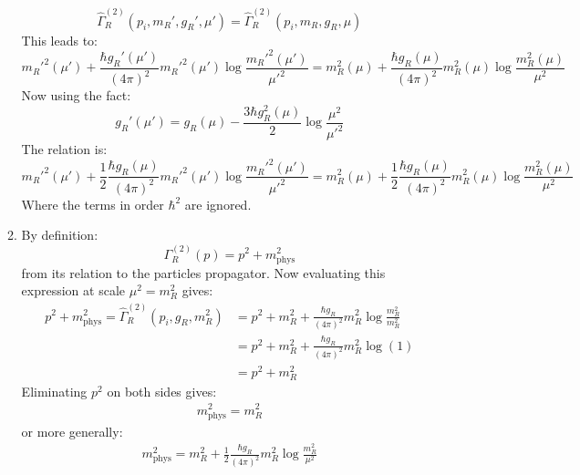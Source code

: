 \documentclass[12pt,a4]{article}
\begin{document}
\begin{enumerate}
\begin{enumerate}
        \begin{equation*}
          \hat\Gamma^{(2)}_R(p_i, m_R', g_R', \mu') =  \hat\Gamma^{(2)}_R(p_i, m_R, g_R, \mu)
        \end{equation*}
        This leads to:
        \begin{equation*}
          m_R'^2(\mu') + \frac{\hbar g_R'(\mu') }{(4\pi)^2}  m_R'^2(\mu') \log \frac{m_R'^2(\mu')}{\mu'^2} = m_R^2(\mu) + \frac{\hbar g_R (\mu)}{(4\pi)^2}  m_R^2(\mu) \log \frac{m_R^2(\mu)}{\mu^2}
        \end{equation*}
        Now using the fact:
        \begin{equation*}
          g_R'(\mu ') = g_R(\mu) - \frac{3\hbar g_R^2(\mu)}{2}\log\frac{\mu^2}{\mu'^2}
        \end{equation*}
        The relation is:
        \begin{equation}
          m_R'^2(\mu') + \frac{1}{2}\frac{\hbar g_R(\mu)}{(4\pi)^2}  m_R'^2(\mu') \log \frac{m_R'^2(\mu')}{\mu'^2}= m_R^2(\mu) + \frac{1}{2}\frac{\hbar g_R (\mu)}{(4\pi)^2}  m_R^2(\mu) \log \frac{m_R^2(\mu)}{\mu^2} \label{eq:mAtDiffScales}
        \end{equation}
        Where the terms in order $\hbar^2$ are ignored.
      \item
        By definition:
        \begin{equation*}
          \Gamma^{(2)}_R(p) = p^2 + m_{\text{phys}}^2
        \end{equation*}
        from its relation to the particles propagator.
        Now evaluating this expression at scale $\mu^2 = m_R^2$ gives:
        \begin{align*}
          p^2 + m_{\text{phys}}^2 = \hat\Gamma^{(2)}_R(p_i, g_R, m_R^2) &= p^2 + m_R^2 + \frac{\hbar g_R }{(4\pi)^2}  m_R^2 \log \frac{m_R^2}{m_R^2}\\
                                                                        &= p^2 + m_R^2 + \frac{\hbar g_R }{(4\pi)^2}  m_R^2 \log(1) \\
                                                                        &= p^2 + m_R^2                                              
        \end{align*}
        Eliminating $p^2$ on both sides gives:
        \begin{align*}
          m_{\text{phys}}^2 = m_R^2
        \end{align*}
        or more generally:
        \begin{align*}
          m_{\text{phys}}^2 = m_R^2 + \frac{1}{2}\frac{\hbar g_R }{(4\pi)^2}  m_R^2 \log \frac{m_R^2}{\mu^2}

\end{align*}
\end{enumerate}
\end{enumerate}
\end{document}
